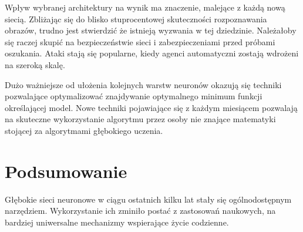 \documentclass[12pt,a4paper,twoside,titlepage,openright]{book}
\begin{document}
Wpływ wybranej architektury na wynik ma znaczenie, malejące z każdą nową siecią. Zbliżając się do blisko stuprocentowej skuteczności rozpoznawania obrazów, trudno jest stwierdzić że istnieją wyzwania w tej dziedzinie. Należałoby się raczej skupić na bezpieczeństwie sieci i zabezpieczeniami przed próbami oszukania. Ataki stają się popularne, kiedy agenci automatyczni zostają wdrożeni na szeroką skalę.

Dużo ważniejsze od ułożenia kolejnych warstw neuronów okazują się techniki pozwalające optymalizować znajdywanie optymalnego minimum funkcji określającej model. Nowe techniki pojawiające się z każdym miesiącem pozwalają na skuteczne wykorzystanie algorytmu przez osoby nie znające matematyki stojącej za algorytmami głębokiego uczenia.


\chapter*{Podsumowanie}
Głębokie sieci neuronowe w ciągu ostatnich kilku lat stały się ogólnodostępnym narzędziem. Wykorzystanie ich zminiło postać z zastosowań naukowych, na bardziej uniwersalne mechanizmy wspierające życie codzienne.


\listoffigures


\printbibliography
\end{document}
